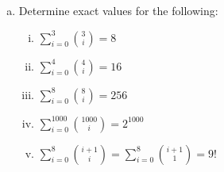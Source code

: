 \documentclass{scrartcl}
\begin{document}
\begin{enumerate}
\begin{enumerate}[a)]
\item Determine exact values for the following:
\begin{enumerate}[i)]

\item $\sum_{i=0}^3 {3 \choose i} = 8$

\item $\sum_{i=0}^4 {4 \choose i} = 16$

\item $\sum_{i=0}^8 {8 \choose i} = 256$

\item $\sum_{i=0}^{1000} {1000 \choose i} = 2^{1000}$

\item $\sum_{i=0}^8 {i+1 \choose i} = \sum_{i=0}^8 {i+1 \choose 1} = 9!$

\end{enumerate}
\end{enumerate}
\end{enumerate}
\end{document}

